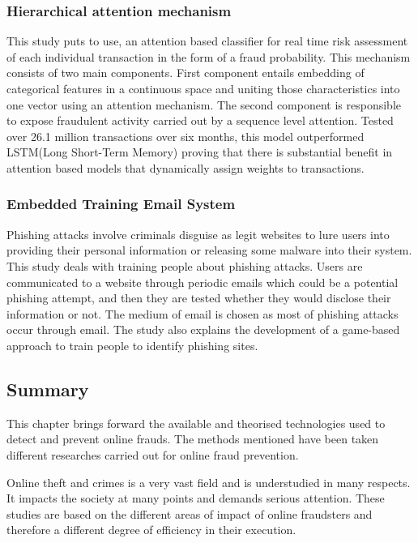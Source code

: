 \documentclass[12pt, oneside, a4paper]{article}
\begin{document}
\subsubsection{Hierarchical attention mechanism}
This study\cite{PrevailingMethods5} puts to use, an attention based classifier for real time risk assessment of each individual transaction in the form of a fraud probability. This mechanism consists of two main components. First component entails embedding of categorical features in a continuous space and uniting those characteristics into one vector using an attention mechanism. The second component is responsible to expose fraudulent activity carried out by a sequence level attention. Tested over 26.1 million transactions over six months, this model outperformed LSTM(Long Short-Term Memory) proving  that there is substantial benefit in attention based models that dynamically assign weights to transactions.

\subsubsection{Embedded Training Email System}
Phishing attacks involve criminals disguise as legit websites to lure users into providing their personal information or releasing some malware into their system. This study\cite{PrevailingMethods6} deals with training people about phishing attacks. Users are communicated to a website through periodic emails which could be a potential phishing attempt, and then they are tested whether they would disclose their information or not. The medium of email is chosen as most of phishing attacks occur through email. The study also explains the development of a game-based approach to train people to identify phishing sites.

\pagebreak

\subsection{Summary}
This chapter brings forward the available and theorised technologies used to detect and prevent online frauds. The methods mentioned have been taken different researches carried out for online fraud prevention.

Online theft and crimes is a very vast field and is understudied in many respects. It impacts the society at many points and demands serious attention. These studies are based on the different areas of impact of online fraudsters and therefore a different degree of efficiency in their execution. 
\end{document}
